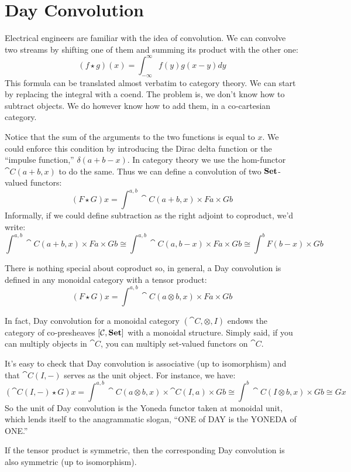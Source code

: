 \documentclass[DaoFP]{subfiles}
\begin{document}
\section{Day Convolution}

Electrical engineers are familiar with the idea of convolution. We can convolve two streams by shifting one of them and summing its product with the other one: 
\[ (f \star g)(x) = \int^{\infty}_{-\infty} f(y) g(x - y) dy \]
This formula can be translated almost verbatim to category theory. We can start by replacing the integral with a coend. The problem is, we don't know how to subtract objects. We do however know how to add them, in a co-cartesian category. 

Notice that the sum of the arguments to the two functions is equal to $x$. We could enforce this condition by introducing the Dirac delta function or the ``impulse function,'' $\delta(a + b - x)$. In category theory we use the hom-functor $\cat C (a + b, x)$ to do the same. Thus we can define a convolution of two $\mathbf{Set}$-valued functors:
\[ (F \star G) x = \int^{a, b} \cat C (a + b, x) \times F a \times G b \]
Informally, if we could define subtraction as the right adjoint to coproduct, we'd write:
\[ \int^{a, b} \cat C (a + b, x) \times F a \times G b \cong \int^{a, b} \cat C (a, b - x) \times F a \times G b \cong \int^b F (b - x) \times G b\]

There is nothing special about coproduct so, in general, a Day convolution is defined in any monoidal category with a tensor product:
\[ (F \star G) x = \int^{a, b} \cat C (a \otimes b, x) \times F a \times G b \]

In fact, Day convolution for a monoidal category $(\cat C, \otimes, I)$ endows the category of co-presheaves $[\mathcal{C}, \mathbf{Set}]$ with a monoidal structure. Simply said, if you can multiply objects in $\cat C$, you can multiply set-valued functors on $\cat C$.

It's easy to check that Day convolution is associative (up to isomorphism) and that $\cat C(I, -)$ serves as the unit object. For instance, we have:
\[ (\cat C(I, -) \star G) x =  \int^{a, b} \cat C (a \otimes b, x) \times \cat C(I, a) \times G b \cong 
  \int^{b} \cat C (I \otimes b, x) \times  G b \cong G x\]
So the unit of Day convolution is the Yoneda functor taken at monoidal unit, which lends itself to the anagrammatic slogan, ``ONE of DAY is the YONEDA of ONE.''

If the tensor product is symmetric, then the corresponding Day convolution is also symmetric (up to isomorphism).
\end{document}
